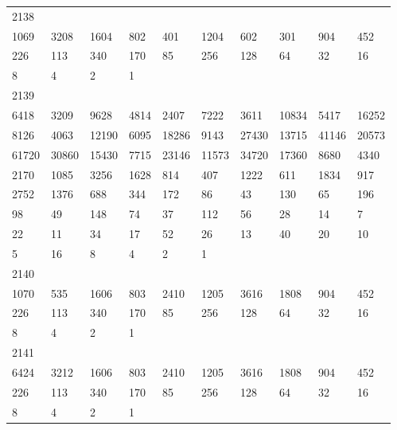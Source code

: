 \begin{longtable}{*{10}{l}}
2138&&&&&&&&&\\
1069& 3208& 1604& 802& 401& 1204& 602& 301& 904& 452\\
226& 113& 340& 170& 85& 256& 128& 64& 32& 16\\
8& 4& 2& 1& \\

2139&&&&&&&&&\\
6418& 3209& 9628& 4814& 2407& 7222& 3611& 10834& 5417& 16252\\
8126& 4063& 12190& 6095& 18286& 9143& 27430& 13715& 41146& 20573\\
61720& 30860& 15430& 7715& 23146& 11573& 34720& 17360& 8680& 4340\\
2170& 1085& 3256& 1628& 814& 407& 1222& 611& 1834& 917\\
2752& 1376& 688& 344& 172& 86& 43& 130& 65& 196\\
98& 49& 148& 74& 37& 112& 56& 28& 14& 7\\
22& 11& 34& 17& 52& 26& 13& 40& 20& 10\\
5& 16& 8& 4& 2& 1& \\

2140&&&&&&&&&\\
1070& 535& 1606& 803& 2410& 1205& 3616& 1808& 904& 452\\
226& 113& 340& 170& 85& 256& 128& 64& 32& 16\\
8& 4& 2& 1& \\

2141&&&&&&&&&\\
6424& 3212& 1606& 803& 2410& 1205& 3616& 1808& 904& 452\\
226& 113& 340& 170& 85& 256& 128& 64& 32& 16\\
8& 4& 2& 1& \\


\end{longtable}
